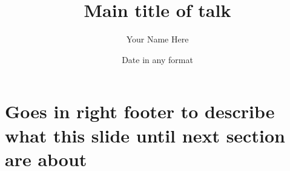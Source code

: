 \documentclass[usenames,dvipsnames]{beamer}
\author{Your Name Here}
\institute[]{University of Minnesota}
\date{Date in any format}
\title[Title footer footer]{Main title of talk}
\subtitle[Left footer]{}
\begin{document}
\titlefooter
\begin{frame}
    \titlepage
\end{frame}

\mainfooter
\section{Goes in right footer to describe what this slide until next section are about}
\end{document}
